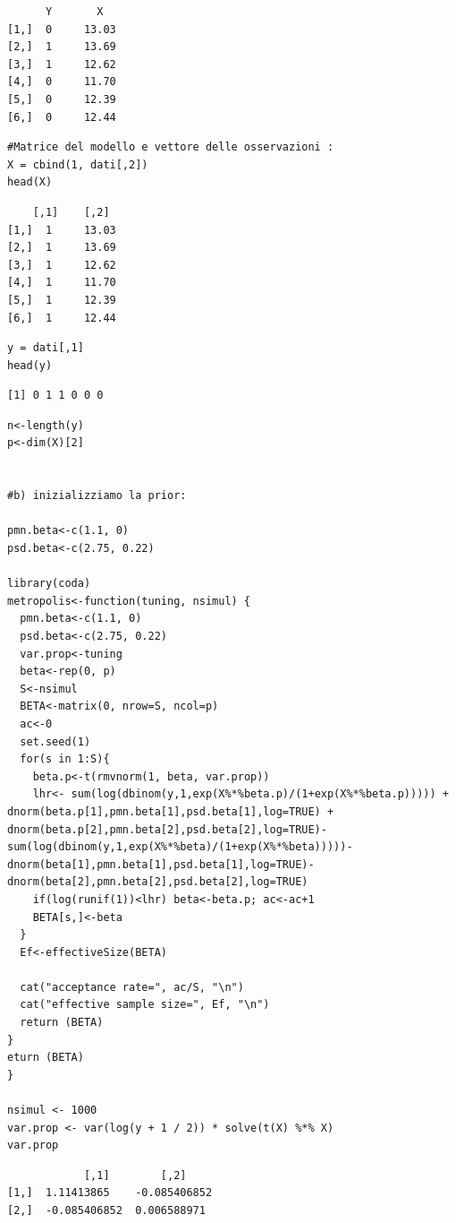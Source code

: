 {
\color{red}
\begin{Verbatim}
      Y       X 
[1,]  0     13.03 
[2,]  1     13.69 
[3,]  1     12.62 	
[4,]  0     11.70 	
[5,]  0     12.39 	
[6,]  0     12.44
\end{Verbatim}
}

\begin{lstlisting}[style=R]
#Matrice del modello e vettore delle osservazioni :
X = cbind(1, dati[,2])
head(X)
\end{lstlisting}

{
\color{red}
\begin{Verbatim}
    [,1]    [,2]
[1,]  1     13.03
[2,]  1     13.69
[3,]  1     12.62
[4,]  1     11.70
[5,]  1     12.39
[6,]  1     12.44
\end{Verbatim}
}

\begin{lstlisting}[style=R]
y = dati[,1]
head(y)
\end{lstlisting}

{
\color{red}
\begin{Verbatim}
[1] 0 1 1 0 0 0
\end{Verbatim}
}

\begin{lstlisting}[style=R]
n<-length(y)
p<-dim(X)[2]


#b) inizializziamo la prior:

pmn.beta<-c(1.1, 0)
psd.beta<-c(2.75, 0.22)

library(coda)
metropolis<-function(tuning, nsimul) {	
  pmn.beta<-c(1.1, 0)
  psd.beta<-c(2.75, 0.22)
  var.prop<-tuning
  beta<-rep(0, p)
  S<-nsimul
  BETA<-matrix(0, nrow=S, ncol=p)
  ac<-0
  set.seed(1)
  for(s in 1:S){
    beta.p<-t(rmvnorm(1, beta, var.prop))
    lhr<- sum(log(dbinom(y,1,exp(X%*%beta.p)/(1+exp(X%*%beta.p))))) + dnorm(beta.p[1],pmn.beta[1],psd.beta[1],log=TRUE) + dnorm(beta.p[2],pmn.beta[2],psd.beta[2],log=TRUE)-sum(log(dbinom(y,1,exp(X%*%beta)/(1+exp(X%*%beta)))))-dnorm(beta[1],pmn.beta[1],psd.beta[1],log=TRUE)-dnorm(beta[2],pmn.beta[2],psd.beta[2],log=TRUE)
    if(log(runif(1))<lhr) beta<-beta.p; ac<-ac+1
    BETA[s,]<-beta 
  }
  Ef<-effectiveSize(BETA)
  
  cat("acceptance rate=", ac/S, "\n")
  cat("effective sample size=", Ef, "\n")
  return (BETA)
}
eturn (BETA)
}

nsimul <- 1000
var.prop <- var(log(y + 1 / 2)) * solve(t(X) %*% X)
var.prop
\end{lstlisting}

{
\color{red}
\begin{Verbatim}
            [,1]		[,2]
[1,]  1.11413865	-0.085406852
[2,]  -0.085406852	0.006588971
\end{Verbatim}
}

